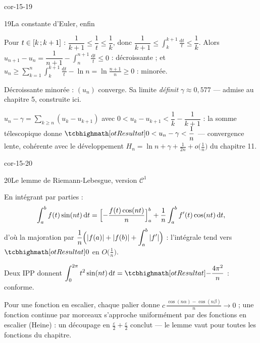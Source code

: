 \begin{blocLivre}{cor-15-19}
\begin{corrige}{19}{La constante d'Euler, enfin}
\begin{questions}
  \item Pour $t\in\mathopen{[}k\,{;}\,k+1\mathclose{]}$ :
    $\dfrac{1}{k+1}\leqslant\dfrac1t\leqslant\dfrac1k$, donc
    $\dfrac{1}{k+1}\leqslant\displaystyle\int_{k}^{k+1}\frac{\mathrm{d}t}{t}
    \leqslant\dfrac1k$. Alors
    $u_{n+1}-u_n=\dfrac{1}{n+1}-\displaystyle\int_{n}^{n+1}\frac{\mathrm{d}t}{t}
    \leqslant0$ : décroissante ; et
    $u_n\geqslant\displaystyle\sum_{k=1}^{n}\int_{k}^{k+1}\frac{\mathrm{d}t}{t}
    -\ln n=\ln\frac{n+1}{n}\geqslant0$ : minorée.
  \item Décroissante minorée : $(u_n)$ converge. Sa limite \emph{définit}
    $\gamma\approx0{,}577$ — admise au chapitre 5, construite ici.
  \item $u_n-\gamma=\displaystyle\sum_{k\geqslant n}(u_k-u_{k+1})$ avec
    $0<u_k-u_{k+1}<\dfrac1k-\dfrac{1}{k+1}$ : la somme télescopique donne
    $\res{0<u_n-\gamma<\dfrac1n}$ — convergence lente, cohérente avec le
    développement $H_n=\ln n+\gamma+\frac{1}{2n}+o\bigl(\frac1n\bigr)$ du
    chapitre 11.
\end{questions}
\end{corrige}
\end{blocLivre}

\begin{blocLivre}{cor-15-20}
\begin{corrige}{20}{Le lemme de Riemann-Lebesgue, version $\mathcal{C}^{1}$}
\begin{questions}
  \item En intégrant par parties :
    \[
    \int_{a}^{b}f(t)\sin(nt)\,\mathrm{d}t
    =\Bigl[-\frac{f(t)\cos(nt)}{n}\Bigr]_{a}^{b}
    +\frac1n\int_{a}^{b}f'(t)\cos(nt)\,\mathrm{d}t ,
    \]
    d'où la majoration par
    $\dfrac1n\Bigl(|f(a)|+|f(b)|+\displaystyle\int_{a}^{b}|f'|\Bigr)$ :
    l'intégrale tend vers $\res{0}$ en $O\bigl(\frac1n\bigr)$.
  \item Deux IPP donnent
    $\displaystyle\int_{0}^{2\pi}t^{2}\sin(nt)\,\mathrm{d}t
    =\res{-\dfrac{4\pi^{2}}{n}}$ : conforme.
  \item Pour une fonction en escalier, chaque palier donne
    $c\,\frac{\cos(n\alpha)-\cos(n\beta)}{n}\to0$ ; une fonction continue
    par morceaux s'approche uniformément par des fonctions en escalier
    (Heine) : un découpage en $\frac\varepsilon2+\frac\varepsilon2$
    conclut — le lemme vaut pour toutes les fonctions du chapitre.
\end{questions}
\end{corrige}
\end{blocLivre}

